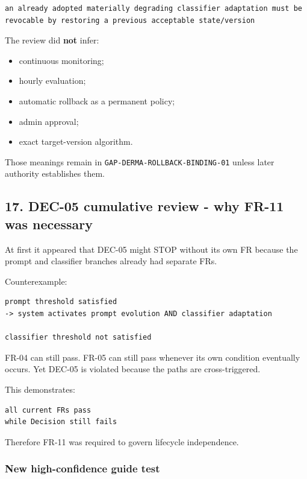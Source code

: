 \documentclass[11pt,a4paper]{article}
\providecommand{\tightlist}{\setlength{\itemsep}{0pt}\setlength{\parskip}{0pt}}
\begin{document}
\begin{verbatim}
an already adopted materially degrading classifier adaptation must be revocable by restoring a previous acceptable state/version
\end{verbatim}

The review did \textbf{not} infer:

\begin{itemize}
\tightlist
\item
  continuous monitoring;
\item
  hourly evaluation;
\item
  automatic rollback as a permanent policy;
\item
  admin approval;
\item
  exact target-version algorithm.
\end{itemize}

Those meanings remain in \texttt{GAP-DERMA-ROLLBACK-BINDING-01} unless
later authority establishes them.

\subsection{17. DEC-05 cumulative review - why FR-11 was
necessary}\label{17-dec-05-cumulative-review---why-fr-11-was-necessary}

At first it appeared that DEC-05 might STOP without its own FR because
the prompt and classifier branches already had separate FRs.

Counterexample:

\begin{verbatim}
prompt threshold satisfied
-> system activates prompt evolution AND classifier adaptation

classifier threshold not satisfied
\end{verbatim}

FR-04 can still pass. FR-05 can still pass whenever its own condition
eventually occurs. Yet DEC-05 is violated because the paths are
cross-triggered.

This demonstrates:

\begin{verbatim}
all current FRs pass
while Decision still fails
\end{verbatim}

Therefore FR-11 was required to govern lifecycle independence.

\subsubsection{New high-confidence guide
test}\label{new-high-confidence-guide-test}
\end{document}

